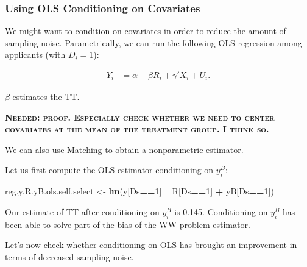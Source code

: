 \documentclass[]{book}
\newenvironment{Shaded}{\begin{snugshade}}{\end{snugshade}}
\newcommand{\KeywordTok}[1]{\textcolor[rgb]{0.13,0.29,0.53}{\textbf{#1}}}
\newcommand{\DecValTok}[1]{\textcolor[rgb]{0.00,0.00,0.81}{#1}}
\newcommand{\StringTok}[1]{\textcolor[rgb]{0.31,0.60,0.02}{#1}}
\newcommand{\OperatorTok}[1]{\textcolor[rgb]{0.81,0.36,0.00}{\textbf{#1}}}
\newcommand{\NormalTok}[1]{#1}
\theoremstyle{definition}
\theoremstyle{definition}
\theoremstyle{definition}
\theoremstyle{remark}
\let\BeginKnitrBlock\begin \let\EndKnitrBlock\end
\begin{document}
\subsubsection{Using OLS Conditioning on
Covariates}\label{using-ols-conditioning-on-covariates-1}

We might want to condition on covariates in order to reduce the amount
of sampling noise. Parametrically, we can run the following OLS
regression among applicants (with \(D_i=1\)):

\begin{align*}
    Y_i &  = \alpha +  \beta R_i + \gamma' X_i + U_i.
\end{align*}

\(\beta\) estimates the TT.

\textbf{\textsc{Needed: proof. Especially check whether we need to
center covariates at the mean of the treatment group. I think so.}}

We can also use Matching to obtain a nonparametric estimator.

\BeginKnitrBlock{example}
\protect\hypertarget{exm:unnamed-chunk-85}{}{\label{exm:unnamed-chunk-85}
}Let us first compute the OLS estimator conditioning on \(y_i^B\):
\EndKnitrBlock{example}

\begin{Shaded}
\begin{Highlighting}[]
\NormalTok{reg.y.R.yB.ols.self.select <-}\StringTok{ }\KeywordTok{lm}\NormalTok{(y[Ds}\OperatorTok{==}\DecValTok{1}\NormalTok{] }\OperatorTok{~}\StringTok{ }\NormalTok{R[Ds}\OperatorTok{==}\DecValTok{1}\NormalTok{] }\OperatorTok{+}\StringTok{ }\NormalTok{yB[Ds}\OperatorTok{==}\DecValTok{1}\NormalTok{])}
\end{Highlighting}
\end{Shaded}

Our estimate of TT after conditioning on \(y_i^B\) is 0.145.
Conditioning on \(y_i^B\) has been able to solve part of the bias of the
WW problem estimator.

Let's now check whether conditioning on OLS has brought an improvement
in terms of decreased sampling noise.
\end{document}
